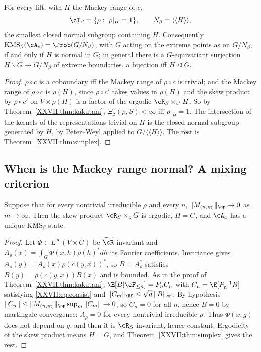 \begin{corollary}\label{XXVII:cor:normalclosure}
For every lift, with $H$ the Mackey range of $c$,
\[
\cT_\beta=\{\rho:\ \rho|_H=1\},\qquad N_\beta=\langle\langle H\rangle\rangle ,
\]
the smallest closed normal subgroup containing $H$. Consequently
$\mathrm{KMS}_\beta(\cA_c)=\Prob(G/N_\beta)$, with $G$ acting on the extreme points as on
$G/N_\beta$, if and only if $H$ is normal in $G$; in general there is a $G$-equivariant
surjection $H\backslash G\to G/N_\beta$ of extreme boundaries, a bijection iff $H\trianglelefteq G$.
\end{corollary}

\begin{proof}
$\rho\circ c$ is a coboundary iff the Mackey range of $\rho\circ c$ is trivial; and the Mackey
range of $\rho\circ c$ is $\rho(H)$, since $\rho\circ c'$ takes values in $\rho(H)$ and the
skew product by $\rho\circ c'$ on $V\times\rho(H)$ is a factor of the ergodic
$\cR_S\ltimes_{c'}H$. So by Theorem~\ref{XXVII:thm:kakutani}, $\Xi_\beta(\rho,S)<\infty$ iff
$\rho|_H=1$. The intersection of the kernels of the representations trivial on $H$ is the
closed normal subgroup generated by $H$, by Peter--Weyl applied to $G/\langle\langle H\rangle\rangle$.
The rest is Theorem~\ref{XXVII:thm:simplex}.
\end{proof}

\subsection{When is the Mackey range normal? A mixing criterion}

\begin{theorem}[Mixing forces $H=G$]\label{XXVII:thm:mixing}
Suppose that for every nontrivial irreducible $\rho$ and every $n$,
$\|M_{(n,m]}\|_{\op}\to0$ as $m\to\infty$. Then the skew product $\cR_S\ltimes_cG$ is ergodic,
$H=G$, and $\cA_c$ has a unique $\mathrm{KMS}_\beta$ state.
\end{theorem}

\begin{proof}
Let $\Phi\in L^\infty(V\times G)$ be $\widetilde\cR$-invariant and $A_\rho(x)=\int_G\Phi(x,h)\rho(h)^*dh$
its Fourier coefficients. Invariance gives $A_\rho(y)=A_\rho(x)\rho(c(y,x))^*$, so $B=A_\rho^*$
satisfies $B(y)=\rho(c(y,x))B(x)$ and is bounded. As in the proof of
Theorem~\ref{XXVII:thm:kakutani}, $\E[B|\cF_{\le n}]=P_nC_n$ with $C_n=\E[P_n^{-1}B]$ satisfying
\eqref{XXVII:eq:consist} and $\|C_m\|_{\HS}\le\sqrt d\,\|B\|_\infty$. By hypothesis
$\|C_n\|\le\|M_{(n,m]}\|_{\op}\sup_m\|C_m\|\to0$, so $C_n=0$ for all $n$, hence $B=0$ by
martingale convergence: $A_\rho=0$ for every nontrivial irreducible $\rho$. Thus $\Phi(x,g)$
does not depend on $g$, and then it is $\cR_S$-invariant, hence constant. Ergodicity of the
skew product means $H=G$, and Theorem~\ref{XXVII:thm:simplex} gives the rest.
\end{proof}

